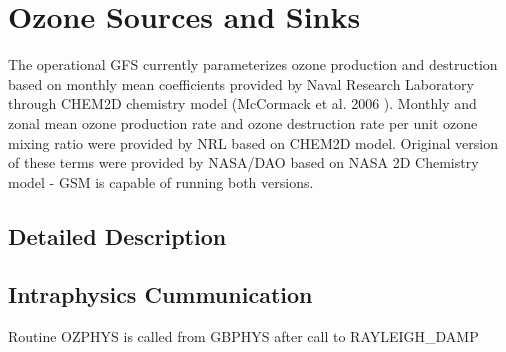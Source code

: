 \hypertarget{group__ozn}{}\section{Ozone Sources and Sinks}
\label{group__ozn}


The operational G\+FS currently parameterizes ozone production and destruction based on monthly mean coefficients provided by Naval Research Laboratory through C\+H\+E\+M2D chemistry model (Mc\+Cormack et al. 2006 \cite{mccormack_et_al_2006}). Monthly and zonal mean ozone production rate and ozone destruction rate per unit ozone mixing ratio were provided by N\+RL based on C\+H\+E\+M2D model. Original version of these terms were provided by N\+A\+S\+A/\+D\+AO based on N\+A\+SA 2D Chemistry model -\/ G\+SM is capable of running both versions.  




\subsection{Detailed Description}
\hypertarget{group__ozn_intra_oz}{}\subsection{Intraphysics Cummunication}\label{group__ozn_intra_oz}

\begin{DoxyItemize}
\item Routine O\+Z\+P\+H\+YS is called from G\+B\+P\+H\+YS after call to R\+A\+Y\+L\+E\+I\+G\+H\+\_\+\+D\+A\+MP
\end{DoxyItemize}


